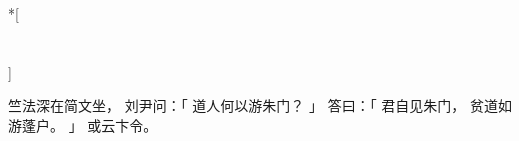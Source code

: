 
\switchcolumn[0]*[\section{}]

竺法深在简文坐，
刘尹问：「
    道人何以游朱门？
」
答曰：「
    君自见朱门，
    贫道如游蓬户。
」
或云卞令。

\switchcolumn


